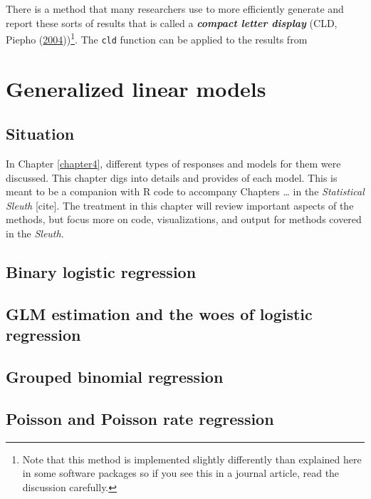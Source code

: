\documentclass[
]{book}
\begin{document}
\indent There is a method that many researchers use to more efficiently generate and
report these sorts of results that is called a \textbf{\emph{compact letter display}} 
(CLD, Piepho (\protect\hyperlink{ref-Piepho2004}{2004}))\footnote{Note that this method is implemented slightly differently than explained here in some software packages so if you see this in a journal article, read the discussion carefully.}. The \texttt{cld} function can be applied to the results from

\hypertarget{chapter12}{%
\chapter{Generalized linear models}\label{chapter12}}

\hypertarget{section12-1}{%
\section{Situation}\label{section12-1}}

In Chapter \ref{chapter4}, different types of responses and models for them were discussed. This chapter digs into details and provides of each model. This is meant to be a companion with R code to accompany Chapters \ldots{} in the \emph{Statistical Sleuth} {[}cite{]}. The treatment in this chapter will review important aspects of the methods, but focus more on code, visualizations, and output for methods covered in the \emph{Sleuth}.

\hypertarget{section12-2}{%
\section{Binary logistic regression}\label{section12-2}}

\hypertarget{section12-3}{%
\section{GLM estimation and the woes of logistic regression}\label{section12-3}}

\hypertarget{section12-4}{%
\section{Grouped binomial regression}\label{section12-4}}

\hypertarget{section12-5}{%
\section{Poisson and Poisson rate regression}\label{section12-5}}
\end{document}
